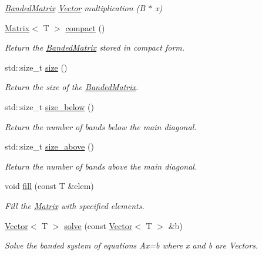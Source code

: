 \begin{DoxyCompactItemize}
\begin{DoxyCompactList}\small\item\em \hyperlink{classLuna_1_1BandedMatrix}{Banded\+Matrix} \hyperlink{classLuna_1_1Vector}{Vector} multiplication (B $\ast$ x) \end{DoxyCompactList}\item 
\hyperlink{classLuna_1_1Matrix}{Matrix}$<$ T $>$ \hyperlink{classLuna_1_1BandedMatrix_ac56e0871d00c024f82174937340bd494}{compact} ()
\begin{DoxyCompactList}\small\item\em Return the \hyperlink{classLuna_1_1BandedMatrix}{Banded\+Matrix} stored in compact form. \end{DoxyCompactList}\item 
std\+::size\+\_\+t \hyperlink{classLuna_1_1BandedMatrix_a06a7beee72765a353161bd87fa772f2f}{size} ()
\begin{DoxyCompactList}\small\item\em Return the size of the \hyperlink{classLuna_1_1BandedMatrix}{Banded\+Matrix}. \end{DoxyCompactList}\item 
std\+::size\+\_\+t \hyperlink{classLuna_1_1BandedMatrix_ae61a6a5f054fad917339f6022f4bbca7}{size\+\_\+below} ()
\begin{DoxyCompactList}\small\item\em Return the number of bands below the main diagonal. \end{DoxyCompactList}\item 
std\+::size\+\_\+t \hyperlink{classLuna_1_1BandedMatrix_a9cced90755c2d5e467b5c6d6f04e3c59}{size\+\_\+above} ()
\begin{DoxyCompactList}\small\item\em Return the number of bands above the main diagonal. \end{DoxyCompactList}\item 
void \hyperlink{classLuna_1_1BandedMatrix_a888b288370b9db1a4de0ea3cfc5a724c}{fill} (const T \&elem)
\begin{DoxyCompactList}\small\item\em Fill the \hyperlink{classLuna_1_1Matrix}{Matrix} with specified elements. \end{DoxyCompactList}\item 
\hyperlink{classLuna_1_1Vector}{Vector}$<$ T $>$ \hyperlink{classLuna_1_1BandedMatrix_aa17b803cb1933ae1f33ff16c8a872060}{solve} (const \hyperlink{classLuna_1_1Vector}{Vector}$<$ T $>$ \&b)
\begin{DoxyCompactList}\small\item\em Solve the banded system of equations Ax=b where x and b are Vectors. \end{DoxyCompactList}\item 

\end{DoxyCompactItemize}
